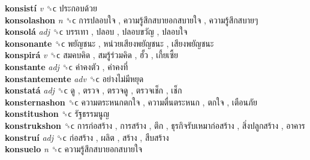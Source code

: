 \textbf{konsistí} \emph{v}  ␝ϲ   ประกอบด้วย   \\
\textbf{konsolashon} \emph{n}  ␝ϲ   การปลอบใจ ,  ความรู้สึกสบายอกสบายใจ ,  ความรู้สึกสบายๆ   \\
\textbf{konsolá} \emph{adj}  ␝ϲ   บรรเทา ,  ปลอบ ,  ปลอบขวัญ ,  ปลอบใจ   \\
\textbf{konsonante} ␝ϲ   พยัญชนะ ,  หน่วยเสียงพยัญชนะ ,  เสียงพยัญชนะ   \\
\textbf{konspirá} \emph{v}  ␝ϲ   สมคบคิด ,  สมรู้ร่วมคิด ,  ฮั้ว ,  เกี้ยเซี้ย   \\
\textbf{konstante} \emph{adj}  ␝ϲ   ค่าคงตัว ,  ค่าคงที่   \\
\textbf{konstantemente} \emph{adv}  ␝ϲ   อย่างไม่มีหยุด   \\
\textbf{konstatá} \emph{adj}  ␝ϲ   ดู ,  ตรวจ ,  ตรวจดู ,  ตรวจเช็ก ,  เช็ก   \\
\textbf{konsternashon} ␝ϲ   ความตระหนกตกใจ ,  ความตื่นตระหนก ,  ตกใจ ,  เตือนภัย   \\
\textbf{konstitushon} ␝ϲ   รัฐธรรมนูญ   \\
\textbf{konstrukshon} ␝ϲ   การก่อสร้าง ,  การสร้าง ,  ตึก ,  ธุรกิจรับเหมาก่อสร้าง ,  สิ่งปลูกสร้าง ,  อาคาร   \\
\textbf{konstruí} \emph{adj}  ␝ϲ   ก่อสร้าง ,  ผลิต ,  สร้าง ,  สืบสร้าง   \\
\textbf{konsuelo} \emph{n}  ␝ϲ   ความรู้สึกสบายอกสบายใจ   \\
